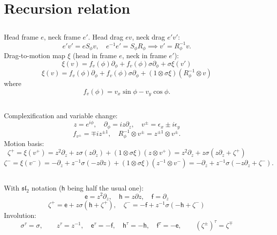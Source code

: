 \documentclass{amsart}
\def\e{\mathsf{e}}
\def\h{\mathsf{h}}
\def\f{\mathsf{f}}
\def\inv{\tau} %
\theoremstyle{definition}
\begin{document}
\section{Recursion relation}
\subsection{}
Head frame $e$, neck frame $e'$. Head drag $ev$, neck drag $e'v'$:
$$ e'v'= e S_\phi v,\quad e^{-1}e' = S_\phi R_\phi \implies v' = R_{\phi}^{-1}v. $$
Drag-to-motion map $\xi$ (head in frame $e$, neck in frame $e'$):
$$ \xi(v) = f_v(\phi)\partial_\phi + f_v(\phi)\sigma\partial_\phi + \sigma \xi(v') $$
$$ \xi(v) = f_v(\phi)\partial_\phi + f_v(\phi)\sigma\partial_\phi + (1\otimes\sigma\xi)(R_\phi^{-1}\otimes v) $$
where
$$ f_v(\phi) = v_x\sin\phi - v_y\cos\phi.$$
\subsection{}
Complexification and variable change:
$$ z = e^{i\phi},\quad \partial_\phi = iz\partial_z,\quad v^\pm = \epsilon_x \pm i\epsilon_y $$
$$ f_{v^\pm} = \mp i z^{\pm 1},\quad
R_\phi^{-1} \otimes v^{\pm} = z^{\pm 1} \otimes v^{\pm}.$$
Motion basis:
$$ \zeta^+ = \xi(v^+) = z^2\partial_z + z \sigma (z\partial_z) + (1\otimes \sigma\xi)(z\otimes v^+)
= z^2\partial_z + z\sigma(z\partial_z + \zeta^+) $$
$$ \zeta^- = \xi(v^-) =- \partial_z + z^{-1}\sigma(-z\partial z) + (1\otimes\sigma\xi)(z^{-1}\otimes v^-)
= -\partial_z + z^{-1}\sigma(-z\partial_z + \zeta^-). $$
\subsection{}
With $\mathfrak{sl}_2$ notation ($\h$ being half the usual one):
$$ \e = z^2\partial_z,\quad \h = z\partial z,\quad \f = \partial_z $$
$$\zeta^+ = \e + z\sigma(\h + \zeta^+),\quad \zeta^- = -\f + z^{-1}\sigma(-\h + \zeta^-)$$
Involution:
$$ \sigma^\inv=\sigma,\qquad z^\inv = z^{-1},\quad \e^\inv=-\f,\quad \h^\inv=-\h,\quad \f^\inv=-\e,
\qquad
\left(\zeta^{\pm}\right)^\inv=\zeta^\mp $$
\end{document}
